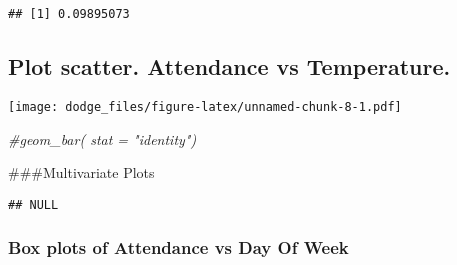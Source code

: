 \documentclass[]{article}
\newenvironment{Shaded}{\begin{snugshade}}{\end{snugshade}}
\newcommand{\CommentTok}[1]{\textcolor[rgb]{0.56,0.35,0.01}{\textit{#1}}}
\newcommand{\DataTypeTok}[1]{\textcolor[rgb]{0.13,0.29,0.53}{#1}}
\newcommand{\DecValTok}[1]{\textcolor[rgb]{0.00,0.00,0.81}{#1}}
\newcommand{\KeywordTok}[1]{\textcolor[rgb]{0.13,0.29,0.53}{\textbf{#1}}}
\newcommand{\NormalTok}[1]{#1}
\newcommand{\OperatorTok}[1]{\textcolor[rgb]{0.81,0.36,0.00}{\textbf{#1}}}
\newcommand{\StringTok}[1]{\textcolor[rgb]{0.31,0.60,0.02}{#1}}
\begin{document}
\begin{verbatim}
## [1] 0.09895073
\end{verbatim}

\hypertarget{plot-scatter.-attendance-vs-temperature.}{%
\subsection{Plot scatter. Attendance vs
Temperature.}\label{plot-scatter.-attendance-vs-temperature.}}

\begin{Shaded}
\end{Shaded}

\texttt{[image: dodge\_files/figure-latex/unnamed-chunk-8-1.pdf]}

\begin{Shaded}
\begin{Highlighting}[]
  \CommentTok{#geom_bar( stat = "identity") }
\end{Highlighting}
\end{Shaded}

\#\#\#Multivariate Plots

\begin{Shaded}
\end{Shaded}

\begin{verbatim}
## NULL
\end{verbatim}

\hypertarget{box-plots-of-attendance-vs-day-of-week}{%
\subsubsection{Box plots of Attendance vs Day Of
Week}\label{box-plots-of-attendance-vs-day-of-week}}
\end{document}
